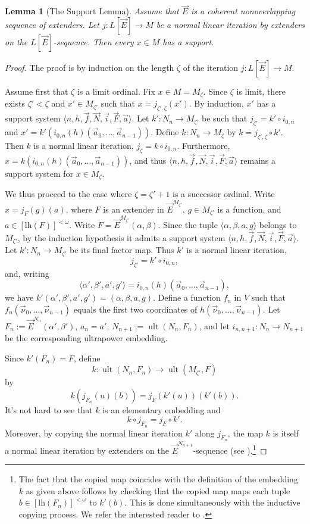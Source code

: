 \documentclass{article}
\theoremstyle{definition}
\theoremstyle{plain}
\newtheorem{lemma}[definition]{Lemma}
\newcommand{\la}{\langle}
\newcommand{\ra}{\rangle}
\DeclareMathOperator{\Ult}{ult}
\begin{document}
\begin{lemma}[The Support Lemma]\label{Lem:SupportLemma}
    Assume that $\vec{E}$ is a coherent nonoverlapping sequence of extenders. Let $j\colon L[\vec{E}]\to M$ be a normal linear iteration by extenders on the $L[\vec{E}]$-sequence. Then every $x\in M$ has a support.
\end{lemma}

\begin{proof}    
    The proof is by induction on the length $\zeta$ of the iteration $j\colon L[\vec E]\to M$. 

    Assume first that $\zeta$ is a limit ordinal. Fix $x\in M = M_\zeta$. Since $\zeta$ is limit, there exists $\zeta'<\zeta$ and $x'\in M_{\zeta'}$ such that $x= j_{\zeta', \zeta}(x')$. By induction, $x'$ has a support system $\la n, h, \vec{f} ,\vec{N}, \vec{i}, \vec{F},  \vec{a}\ra$. Let $k'\colon N_n\to M_{\zeta'}$ be such that $j_{\zeta'} = k'\circ i_{0,n}$ and $x' = k'\left( i_{0,n}(h)(\vec{a}_0, \ldots, \vec{a}_{n-1}) \right)$. Define $k\colon N_n\to M_\zeta$ by $k = j_{\zeta', \zeta} \circ k'$. Then $k$ is a normal linear iteration, $j_{\zeta} = k\circ i_{0,n}$. Furthermore,  $x = k\left( i_{0,n}(h)(\vec{a}_0, \ldots, \vec{a}_{n-1}) \right)$, and thus $\la n,h,\vec{f} ,\vec{N}, \vec{i}, \vec{F},  \vec{a}\ra $ remains a support system for $x\in M_\zeta$. 

   We thus proceed to the case where $\zeta=\zeta'+1$ is a successor ordinal. Write $x=j_F(g)(a)$, where $F$ is an extender in $\vec E^{M_{\zeta'}}$, $g\in M_{\zeta'}$ is a function, and $a\in[\text{lh}(F)]^{<\omega}$. Write $F=\vec E^{M_{\zeta'}}(\alpha,\beta)$. Since the tuple $\la\alpha,\beta,a, g\ra$ belongs to $M_{\zeta'}$, by the induction hypothesis it admits a support system $\la n,h,\vec f,\vec N,\vec i,\vec F,\vec a\ra$. Let $k'\colon N_n\to M_{\zeta'}$ be its final factor map. 
   Thus $k'$ is a normal linear iteration,
   $$j_{\zeta'}=k'\circ i_{0,n},$$
    and, writing $$\la\alpha',\beta',a', g'\ra=
    i_{0,n}(h)(\vec a_0,\ldots,\vec a_{n-1}),$$
    we have $k'( \alpha' ,\beta', a',g' )= (\alpha,\beta, a, g)$.
    Define a function $f_n$ in $V$ such that $f_n(\vec\nu_0,\ldots,\vec\nu_{n-1})$ equals the first two
    coordinates of $h(\vec\nu_0,\ldots,\vec\nu_{n-1})$. Let $F_n:=\vec E^{N_n}(\alpha',\beta')$, $a_n= a'$, $N_{n+1}:=\Ult(N_n,F_n)$, and let $i_{n,n+1}\colon N_n\to N_{n+1}$ be the corresponding ultrapower embedding. 
    
    Since $k'(F_n)=F$, define
    $$ k\colon \Ult(N_n,F_n)\to \Ult(M_{\zeta'},F)$$
    by
    $$ k\left(j_{F_n}(u)(b)\right)= j_F(k'(u))(k'(b)).$$
    It's not hard to see that $k$ is an elementary embedding and
    $$k\circ j_{F_n}=j_F\circ k'. $$
    Moreover, by copying the normal linear iteration $k'$ along $j_{F_n}$,  the map $k$ is itself a normal linear iteration by extenders on the  $\vec E^{N_{n+1}}$-sequence
    (see \cite[Lemma 4.3.1]{ZemanBook}).\footnote{The fact that the copied map coincides with the definition of the embedding $k$ as given above follows by checking that the copied map maps each tuple $b\in [\text{lh}(F_n)]^{<\omega}$ to $k'(b)$. This is done simultaneously with the inductive copying process. We refer the interested reader to \cite[Lemma 4.3.1]{ZemanBook}.}
    

\end{proof}
\end{document}
